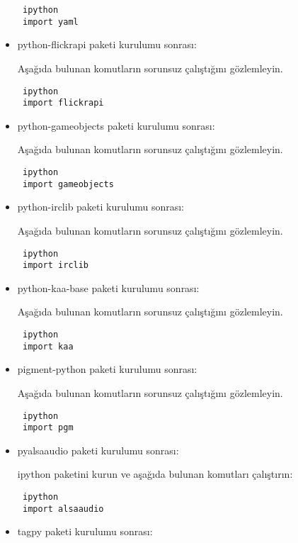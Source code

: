 \documentclass[a4paper,10pt]{article}
\begin{document}
\begin{itemize}
\begin{verbatim}
 ipython
 import yaml
\end{verbatim}

\item python-flickrapi paketi kurulumu sonrası:

Aşağıda bulunan komutların sorunsuz çalıştığını gözlemleyin.

\begin{verbatim}
 ipython
 import flickrapi
\end{verbatim}

\item python-gameobjects paketi kurulumu sonrası:

Aşağıda bulunan komutların sorunsuz çalıştığını gözlemleyin.

\begin{verbatim}
 ipython
 import gameobjects
\end{verbatim}

\item python-irclib paketi kurulumu sonrası:

Aşağıda bulunan komutların sorunsuz çalıştığını gözlemleyin.

\begin{verbatim}
 ipython
 import irclib
\end{verbatim}

\item python-kaa-base paketi kurulumu sonrası:

Aşağıda bulunan komutların sorunsuz çalıştığını gözlemleyin.

\begin{verbatim}
 ipython
 import kaa
\end{verbatim}

\item pigment-python paketi kurulumu sonrası:

Aşağıda bulunan komutların sorunsuz çalıştığını gözlemleyin.

\begin{verbatim}
 ipython
 import pgm
\end{verbatim}

\item pyalsaaudio paketi kurulumu sonrası:

ipython paketini kurun ve aşağıda bulunan komutları çalıştırın:
\begin{verbatim}
 ipython
 import alsaaudio
\end{verbatim}

\item tagpy paketi kurulumu sonrası:


\end{itemize}
\end{document}
